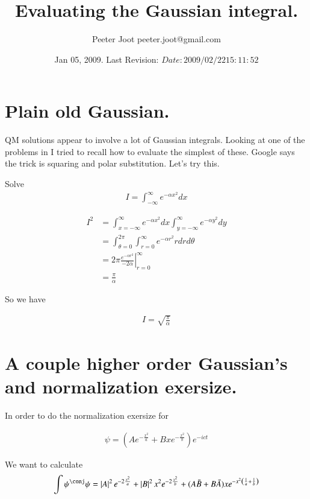 \documentclass{article}
\title{ Evaluating the Gaussian integral. }
\author{Peeter Joot \quad peeter.joot@gmail.com}
\date{ Jan 05, 2009.  Last Revision: $Date: 2009/02/22 15:11:52 $ }
\begin{document}
\maketitle{}
\section{ Plain old Gaussian. }

QM solutions appear to involve a lot of Gaussian integrals.  Looking at one
of the problems in \cite{mcmahon2005qmd} I tried to recall how to evaluate
the simplest of these.  Google says the trick is squaring and polar 
substitution.  Let's try this.

Solve
\begin{align*}
I = \int_{-\infty}^\infty e^{-\alpha x^2} dx
\end{align*}

\begin{align*}
I^2 
&= \int_{x= -\infty}^\infty e^{-\alpha x^2} dx \int_{y = -\infty}^\infty e^{-\alpha y^2} dy \\
&= \int_{\theta=0}^{2\pi}\int_{r= 0}^\infty e^{-\alpha r^2} r dr d\theta \\
&= 2\pi 
{\left.
\frac{e^{-\alpha r^2}}{-2\alpha}
\right\vert}_{r= 0}^\infty  \\
&= \frac{\pi}{\alpha}
\end{align*}

So we have

\begin{align*}
I = \sqrt{\frac{\pi}{\alpha}}
\end{align*}

\section{ A couple higher order Gaussian's and normalization exersize. }

In order to do the normalization exersize for

\begin{align}\label{eqn:exersize}
\psi = \left(A e^{-\frac{x^2}{a}} +B x e^{-\frac{x^2}{b}}\right) e^{-ict}
\end{align}

We want to calculate
\begin{align*}
\int \psi^\conj \psi = 
\Abs{A}^2 e^{-2\frac{x^2}{a}} +\Abs{B}^2 x^2 e^{-2\frac{x^2}{b}}
+ (A\bar{B} + B\bar{A}) x e^{-x^2\left(\inv{a} + \inv{b}\right)}
\end{align*}
\end{document}
